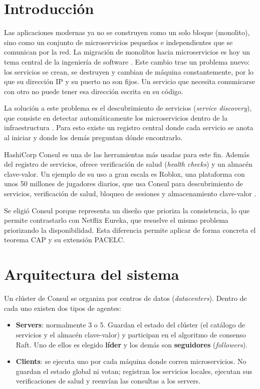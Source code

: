 \documentclass[12pt,a4paper]{article}
\begin{document}
\newpage
\tableofcontents
\newpage

\section{Introducción}
Las aplicaciones modernas ya no se construyen como un solo bloque (monolito), sino como un conjunto de microservicios pequeños e independientes que se comunican por la red. La migración de monolitos hacia microservicios es hoy un tema central de la ingeniería de software \cite{abgaz2023decomposition}. Este cambio trae un problema nuevo: los servicios se crean, se destruyen y cambian de máquina constantemente, por lo que su dirección IP y su puerto no son fijos. Un servicio que necesita comunicarse con otro no puede tener esa dirección escrita en su código.

La solución a este problema es el descubrimiento de servicios (\textit{service discovery}), que consiste en detectar automáticamente los microservicios dentro de la infraestructura \cite[p.~90254]{haindl2024security}. Para esto existe un registro central donde cada servicio se anota al iniciar y donde los demás preguntan dónde encontrarlo.

HashiCorp Consul es una de las herramientas más usadas para este fin. Además del registro de servicios, ofrece verificación de salud (\textit{health checks}) y un almacén clave-valor. Un ejemplo de su uso a gran escala es Roblox, una plataforma con unos 50 millones de jugadores diarios, que usa Consul para descubrimiento de servicios, verificación de salud, bloqueo de sesiones y almacenamiento clave-valor \cite{roblox2022outage}.

Se eligió Consul porque representa un diseño que prioriza la consistencia, lo que permite contrastarlo con Netflix Eureka, que resuelve el mismo problema priorizando la disponibilidad. Esta diferencia permite aplicar de forma concreta el teorema CAP y su extensión PACELC.

\section{Arquitectura del sistema}
Un clúster de Consul se organiza por centros de datos (\textit{datacenters}). Dentro de cada uno existen dos tipos de agentes:

\begin{itemize}
  \item \textbf{Servers}: normalmente 3 o 5. Guardan el estado del clúster (el catálogo de servicios y el almacén clave-valor) y participan en el algoritmo de consenso Raft. Uno de ellos es elegido \textbf{líder} y los demás son \textbf{seguidores} (\textit{followers}).
  \item \textbf{Clients}: se ejecuta uno por cada máquina donde corren microservicios. No guardan el estado global ni votan; registran los servicios locales, ejecutan sus verificaciones de salud y reenvían las consultas a los servers.
\end{itemize}
\end{document}
